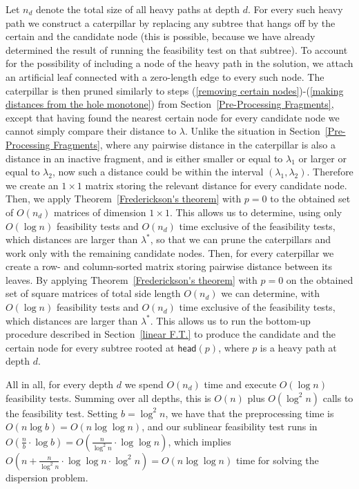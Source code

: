 \documentclass[11pt,a4paper]{article}
\newcommand{\head}{\textsf{head}}
\theoremstyle{definition}
\theoremstyle{remark}
\begin{document}
Let $n_{d}$ denote the total size of all heavy paths at depth $d$. For every such heavy path we construct a caterpillar by replacing
any subtree that hangs off by the certain and the candidate node (this is possible, because we have already determined the result of
running the feasibility test on that subtree). To account for the possibility of including a node of the heavy path in the solution,
we attach an artificial leaf connected with a zero-length edge to every such node.
The caterpillar is then pruned similarly to steps (\ref{removing certain nodes})-(\ref{making distances from the hole monotone})
from Section~\ref{Pre-Processing Fragments}, except that having found the nearest certain node for every candidate
node we cannot simply compare their distance to $\lambda$. Unlike the situation in Section~\ref{Pre-Processing Fragments}, where any pairwise distance in the caterpillar is also a distance in an inactive fragment, and is either smaller or equal to $\lambda_1$ or larger or equal to $\lambda_2$, now such a distance could be within the interval $(\lambda_1,\lambda_2)$. Therefore we create an $1\times 1$ matrix storing the relevant
distance for every candidate node. Then, we apply Theorem~\ref{Frederickson's theorem} with $p=0$ to the obtained set of
$O(n_{d})$ matrices of dimension $1\times 1$. This allows us to determine, using only $O(\log n)$ feasibility tests and
$O(n_{d})$ time exclusive of the feasibility tests, which distances are larger than $\lambda^{*}$, so that we can prune
the caterpillars and work only with the remaining candidate nodes. Then, for every caterpillar we create a row- and column-sorted matrix
storing pairwise distance between its leaves. By applying Theorem~\ref{Frederickson's theorem} with $p=0$ on the obtained set of
square matrices of total side length $O(n_{d})$ we can determine, with $O(\log n)$ feasibility tests and $O(n_{d})$ time
exclusive of the feasibility tests, which distances are larger than $\lambda^{*}$. This allows us to run the bottom-up
procedure described in Section~\ref{linear F.T.} to produce the candidate and the certain node for every subtree rooted
at $\head(p)$, where $p$ is a heavy path at depth $d$.

All in all, for every depth $d$ we spend $O(n_{d})$ time and execute $O(\log n)$ feasibility tests. Summing over all depths,
this is $O(n)$ plus $O(\log^{2}n)$ calls to the feasibility test. Setting $b=\log^{2}n$, we have that the preprocessing time is $O(n \log b) = O(n \log 
\log n)$, and our sublinear feasibility test runs in $O(\frac{n}{b} \cdot \log b) = O(\frac{n}{\log ^2 n} \cdot \log \log n)$, which implies $O(n+\frac{n}{\log^{2}n}\cdot\log\log n\cdot \log^{2}n)=O(n\log\log n)$ time for solving the dispersion problem.
\end{document}
